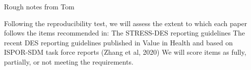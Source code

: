 Rough notes from Tom

Following the reproducibility test, we will assess the extent to which each paper follows the items recommended in:
The STRESS-DES reporting guidelines
The recent DES reporting guidelines published in Value in Health and based on ISPOR-SDM task force reports (Zhang et al, 2020)
We will score items as fully, partially, or not meeting the requirements.
